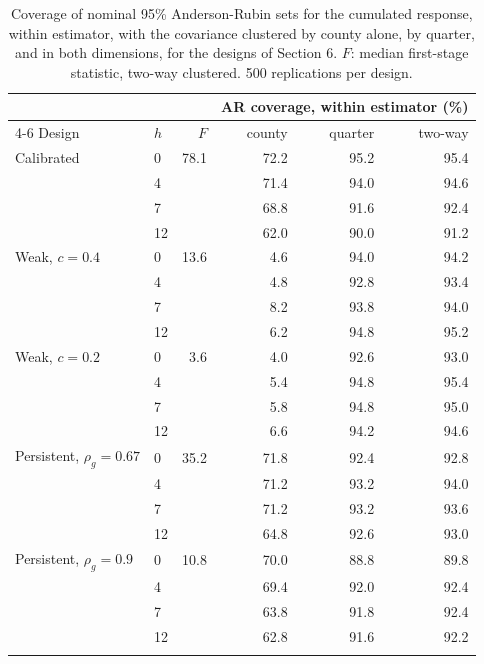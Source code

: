 \begin{table}[ht]\centering\footnotesize
\begin{tabular}{llr rrr}\toprule
 & & & \multicolumn{3}{c}{AR coverage, within estimator (\%)}\\ \cmidrule(lr){4-6}
Design & $h$ & $F$ & county & quarter & two-way\\\midrule
Calibrated & 0 & 78.1 & 72.2 & 95.2 & 95.4\\
 & 4 &  & 71.4 & 94.0 & 94.6\\
 & 7 &  & 68.8 & 91.6 & 92.4\\
 & 12 &  & 62.0 & 90.0 & 91.2\\
\addlinespace
Weak, $c=0.4$ & 0 & 13.6 & 4.6 & 94.0 & 94.2\\
 & 4 &  & 4.8 & 92.8 & 93.4\\
 & 7 &  & 8.2 & 93.8 & 94.0\\
 & 12 &  & 6.2 & 94.8 & 95.2\\
\addlinespace
Weak, $c=0.2$ & 0 & 3.6 & 4.0 & 92.6 & 93.0\\
 & 4 &  & 5.4 & 94.8 & 95.4\\
 & 7 &  & 5.8 & 94.8 & 95.0\\
 & 12 &  & 6.6 & 94.2 & 94.6\\
\addlinespace
Persistent, $\rho_g=0.67$ & 0 & 35.2 & 71.8 & 92.4 & 92.8\\
 & 4 &  & 71.2 & 93.2 & 94.0\\
 & 7 &  & 71.2 & 93.2 & 93.6\\
 & 12 &  & 64.8 & 92.6 & 93.0\\
\addlinespace
Persistent, $\rho_g=0.9$ & 0 & 10.8 & 70.0 & 88.8 & 89.8\\
 & 4 &  & 69.4 & 92.0 & 92.4\\
 & 7 &  & 63.8 & 91.8 & 92.4\\
 & 12 &  & 62.8 & 91.6 & 92.2\\
\addlinespace
\bottomrule\end{tabular}
\caption{Coverage of nominal 95\% Anderson-Rubin sets for the cumulated response, within estimator, with the covariance clustered by county alone, by quarter, and in both dimensions, for the designs of Section 6. $F$: median first-stage statistic, two-way clustered. 500 replications per design.\label{tab:mc_county}}
\end{table}